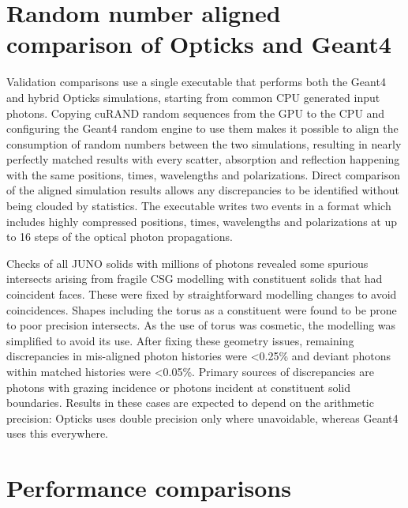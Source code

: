 \documentclass{webofc}
\begin{document}
\section{Random number aligned comparison of Opticks and Geant4}
\label{validation}
%
Validation comparisons use a single executable that performs both
the Geant4 and hybrid Opticks simulations, starting from common CPU generated input photons. 
Copying cuRAND random sequences from the GPU to the CPU and configuring the Geant4 random engine to use them makes it possible to align the 
consumption of random numbers between the two simulations, resulting in nearly perfectly matched results with every scatter, 
absorption and reflection happening with the same positions, times, wavelengths and polarizations.
Direct comparison of the aligned simulation results allows any discrepancies to be identified without
being clouded by statistics.
The executable writes two events in a format which includes highly compressed positions, times, wavelengths 
and polarizations at up to 16 steps of the optical photon propagations.

Checks of all JUNO solids with millions of photons revealed some spurious intersects  
arising from fragile CSG modelling with constituent solids that had coincident faces.  
These were fixed by straightforward modelling changes to avoid coincidences. 
Shapes including the torus as a constituent were found to be prone to poor precision intersects. 
As the use of torus was cosmetic, the modelling was simplified to avoid its use.  
After fixing these geometry issues, remaining discrepancies in mis-aligned photon histories
were <0.25\% and deviant photons within matched histories were <0.05\%. 
Primary sources of discrepancies are photons with grazing incidence or photons incident
at constituent solid boundaries. Results in these cases are expected to depend on the arithmetic precision: Opticks uses double precision 
only where unavoidable, whereas Geant4 uses this everywhere. 
%
%
\section{Performance comparisons}
\end{document}
